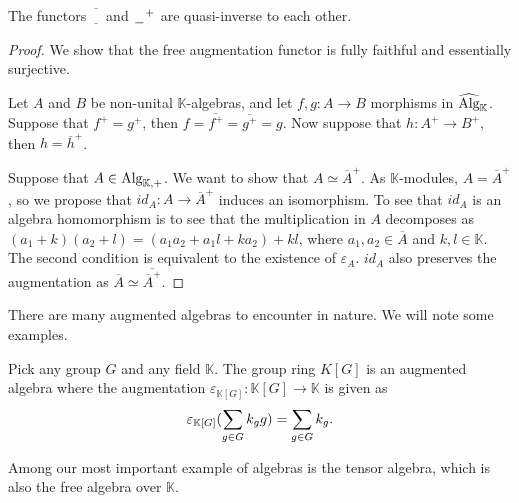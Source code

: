 \documentclass[../thesis.tex]{subfiles}
\begin{document}
            \begin{proposition}
                The functors $\overline{\underline{\phantom{A}}}$ and $\argument^+$ are quasi-inverse to each other.
            \end{proposition}

            \begin{proof}
                We show that the free augmentation functor is fully faithful and essentially surjective. 

                Let $A$ and $B$ be non-unital $\mathbb{K}$-algebras, and let $f,g : A \rightarrow B$ morphisms in $\widehat{\tt{Alg}}_\mathbb{K}$. Suppose that $f^+ = g^+$, then $f = \overline{f^+} = \overline{g^+} = g$. Now suppose that $h : A^+ \rightarrow B^+$, then $h = \overline{h}^+$.

                Suppose that $A\in \tt{Alg}_{\mathbb{K},+}$. We want to show that $A \simeq \overline{A}^+$. As $\mathbb{K}$-modules, $A = \overline{A}^+$, so we propose that $id_A : A \rightarrow \overline{A}^+$ induces an isomorphism. To see that $id_A$ is an algebra homomorphism is to see that the multiplication in $A$ decomposes as $(a_1 + k)(a_2 + l) = (a_1a_2 + a_1l + ka_2) + kl$, where $a_1,a_2\in \overline{A}$ and $k,l \in \mathbb{K}$. The second condition is equivalent to the existence of $\varepsilon_A$. $id_A$ also preserves the augmentation as $\overline{A} \simeq \overline{\overline{A}^+}$.
            \end{proof}

            There are many augmented algebras to encounter in nature. We will note some examples.

            \begin{example}
                Pick any group $G$ and any field $\mathbb{K}$. The group ring $K[G]$ is an augmented algebra where the augmentation $\varepsilon_{\mathbb{K}[G]} : \mathbb{K}[G] \rightarrow \mathbb{K}$ is given as
                \begin{align*}
                    \varepsilon_{\mathbb{K}[G]}(\sum_{g\in G}k_gg) = \sum_{g\in G}k_g\tt{.}
                \end{align*}
            \end{example}

            Among our most important example of algebras is the tensor algebra, which is also the free algebra over $\mathbb{K}$.
\end{document}
